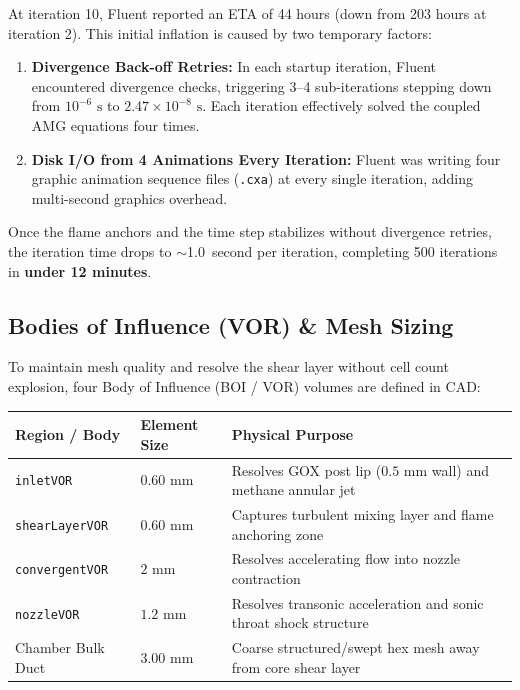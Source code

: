 \documentclass[11pt,a4paper]{article}
\begin{document}
\begin{tcolorbox}[alertbox, title={Why Fluent Displayed an Initial 44-Hour ETA (and Why It Drops)}]
At iteration 10, Fluent reported an ETA of 44 hours (down from 203 hours at iteration 2). This initial inflation is caused by two temporary factors:
\begin{enumerate}\setlength\itemsep{0.15em}
    \item \textbf{Divergence Back-off Retries:} In each startup iteration, Fluent encountered divergence checks, triggering 3--4 sub-iterations stepping down from $10^{-6}\text{ s}$ to $2.47\times10^{-8}\text{ s}$. Each iteration effectively solved the coupled AMG equations four times.
    \item \textbf{Disk I/O from 4 Animations Every Iteration:} Fluent was writing four graphic animation sequence files (\texttt{.cxa}) at every single iteration, adding multi-second graphics overhead.
\end{enumerate}
Once the flame anchors and the time step stabilizes without divergence retries, the iteration time drops to $\sim$1.0~second per iteration, completing 500 iterations in \textbf{under 12 minutes}.
\end{tcolorbox}

\subsection{Bodies of Influence (VOR) \& Mesh Sizing}
To maintain mesh quality and resolve the shear layer without cell count explosion, four Body of Influence (BOI / VOR) volumes are defined in CAD:
\begin{table}[htbp]
	\centering
	\small
	\begin{tabularx}{\textwidth}{L{3.8cm} L{2.5cm} Y}
		\toprule
		\textbf{Region / Body} & \textbf{Element Size} & \textbf{Physical Purpose} \\
		\midrule
		\texttt{inletVOR} & $0.60\text{ mm}$ & Resolves GOX post lip ($0.5\text{ mm}$ wall) and methane annular jet \\
		\texttt{shearLayerVOR} & $0.60\text{ mm}$ & Captures turbulent mixing layer and flame anchoring zone \\
		\texttt{convergentVOR} & $2\text{ mm}$ & Resolves accelerating flow into nozzle contraction \\
		\texttt{nozzleVOR} & $1.2\text{ mm}$ & Resolves transonic acceleration and sonic throat shock structure \\
		Chamber Bulk Duct & $3.00\text{ mm}$ & Coarse structured/swept hex mesh away from core shear layer \\
		\bottomrule
	\end{tabularx}
\end{table}
\end{document}
